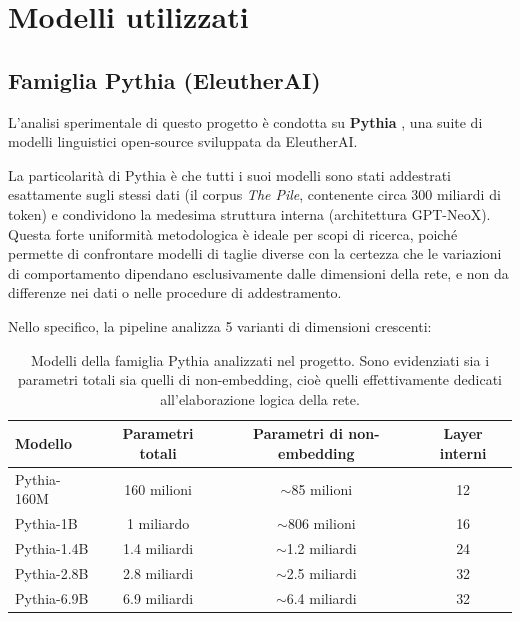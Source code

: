 \documentclass[../relazione.tex]{subfiles}
\begin{document}
\section{Modelli utilizzati}

\subsection{Famiglia Pythia (EleutherAI)}

L'analisi sperimentale di questo progetto è condotta su \textbf{Pythia} \cite{biderman2023pythia}, una suite di modelli linguistici open-source sviluppata da EleutherAI. 

La particolarità di Pythia è che tutti i suoi modelli sono stati addestrati esattamente sugli stessi dati (il corpus \emph{The Pile}, contenente circa 300 miliardi di token) e condividono la medesima struttura interna (architettura GPT-NeoX). 
Questa forte uniformità metodologica è ideale per scopi di ricerca, poiché permette di confrontare modelli di taglie diverse con la certezza che le variazioni di comportamento dipendano esclusivamente dalle dimensioni della rete, e non da differenze nei dati o nelle procedure di addestramento.

Nello specifico, la pipeline analizza 5 varianti di dimensioni crescenti:
\begin{table}[h]
\centering
\begin{tabular}{lccc}
\toprule
\textbf{Modello} & \textbf{Parametri totali} & \textbf{Parametri di non-embedding} & \textbf{Layer interni} \\
\midrule
Pythia-160M  & 160 milioni  & $\sim$85 milioni   & 12 \\
Pythia-1B    & 1 miliardo   & $\sim$806 milioni  & 16 \\
Pythia-1.4B  & 1.4 miliardi & $\sim$1.2 miliardi & 24 \\
Pythia-2.8B  & 2.8 miliardi & $\sim$2.5 miliardi & 32 \\
Pythia-6.9B  & 6.9 miliardi & $\sim$6.4 miliardi & 32 \\
\bottomrule
\end{tabular}
\caption{Modelli della famiglia Pythia analizzati nel progetto. Sono evidenziati sia i parametri totali sia quelli di non-embedding, cioè quelli effettivamente dedicati all'elaborazione logica della rete.}
\end{table}
\end{document}
